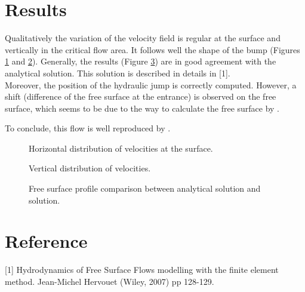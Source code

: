 \section{Results}

\bigskip
Qualitatively the variation of the velocity field is regular at the surface and
vertically in the critical flow area.
It follows well the shape of the bump (Figures \ref{t3d:bump:fig:veloH} 
and \ref{t3d:bump:fig:veloV}).
Generally, the results (Figure \ref{t3d:bump:fig:free_surface}) 
are in good agreement with the analytical
solution. This solution is described in details in [1].\\
Moreover, the position of the hydraulic jump is correctly computed.
However, a shift (difference of the free surface at the entrance) is
observed on the free surface, which seems to be due to the way to
calculate the free surface by .


\bigskip
To conclude, this flow is well reproduced by .

\begin{figure}[!htbp]
 \centering
 \caption{Horizontal distribution of velocities at the surface.}
 \label{t3d:bump:fig:veloH}
\end{figure}
\begin{figure}[!htbp]
 \centering
 \caption{Vertical distribution of velocities.}
 \label{t3d:bump:fig:veloV}
\end{figure}

\begin{figure}[!htbp]
 \centering
 \caption{Free surface profile comparison between analytical solution 
 and  solution.}
 \label{t3d:bump:fig:free_surface}
\end{figure}

\section{Reference}

[1] Hydrodynamics of Free Surface Flows modelling with the finite
element method. Jean-Michel Hervouet (Wiley, 2007) pp 128-129.
